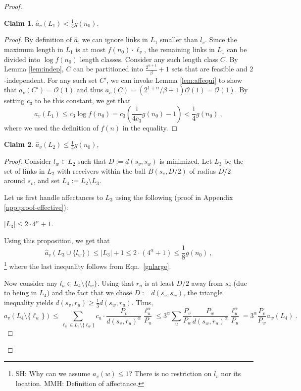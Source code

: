 \documentclass[11pt]{amsart}
\newcommand{\BO}{\mathcal{O}}
\newtheorem{claim}{Claim}
\begin{document}
\begin{proof}
\begin{claim}
\label{affonl1}
$\hat a_v(L_1) < \frac14 g(n_0)$. 
\end{claim}
\begin{proof}
By definition of $\hat a$, we can ignore links in $L_1$ smaller than $l_v$. Since the maximum length in $L_1$ is at most $f(n_0) \cdot \ell_v$, the remaining links in
 $L_1$ can be divided into $\log f(n_0)$ length classes. 
 Consider any such length class $C$.
By Lemma \ref{lem:indep}, $C$ can be partitioned into $\frac{2^{\alpha+1}}{\beta} +1$ sets that are feasible and $2$-independent. For any such set $C'$, we 
can invoke Lemma \ref{lem:affequi} to show that $a_v(C') = \BO(1)$ and thus 
$a_v(C) = (2^{1+\alpha}/\beta +1) \BO(1) = \BO(1)$. By setting $c_3$ to be this constant, we get that
\[ \hat{a}_v(L_1) \le c_3 \log f(n_0) 
  = c_3 \left(\frac1{4 c_3} g(n_0) - 1\right) < \frac14 g(n_0)\ , \]
where we used the definition of $f(n)$ in the equality.
\end{proof}

\begin{claim}
$\hat a_v(L_2) \le \frac{1}{4}g(n_0)$,
\label{affonl2}
\end{claim}
\begin{proof}
Consider $l_w  \in L_2$ such that $D := d(s_v, s_w)$ is
minimized.
Let $L_3$ be the set of links in $L_2$ with 
receivers within the ball $B(s_v, D/2)$ of radius $D/2$ around $s_v$, 
and set $L_4 := L_2 \setminus L_3$.


Let us first handle affectances to $L_3$ using the following  (proof in Appendix \ref{app:proof-effective}):
\begin{proposition}
$|L_3| \leq  2 \cdot 4^{\alpha} + 1$.
\label{prop:l3bound}
\end{proposition}


Using this proposition, we get that
\[ \hat{a}_v(L_3 \cup \{l_w\}) \leq |L_3| +1\leq   2 \cdot (4^{\alpha} + 1) \le \frac{1}{8} g(n_0)\ , \]
\footnote{SH: Why can we assume $a_v(w)\leq 1$? There is no restriction on $l_v$ nor its location. MMH: Definition of affectance.}
where the last inequality follows from Eqn.\ \ref{gnlarge}. 

Now consider any $l_u \in L_4 \setminus \{l_w\}$.
Using that $r_u$ is at least $D/2$ away from $s_v$ (due to being in $L_4$) and the fact that we chose $D:=d(s_v,s_w)$, the triangle inequality yields $d(s_v, r_u) \geq \frac13 d(s_w, r_u)$. Thus,
\begin{equation}
a_{v}(L_4 \setminus \{\ell_w\}) 
  \le \sum_{\ell_u \in L_4 \setminus \{\ell_w\}} c_u\cdot \frac{P_v}{d(s_v, r_u)^{\alpha}} \frac{\ell_u^{\alpha}}{P_u} 
\le
  3^{\alpha} \sum_{u} \frac{P_v}{P_w} \frac{P_w}{d(s_w, r_u)^{\alpha}} \frac{\ell_u^{\alpha}}{P_u}
= 3^{\alpha} \frac{P_v}{P_w} a_w(L_4)\ .
\label{in:1} 
\end{equation} 


\end{proof}
\end{proof}
\end{document}
